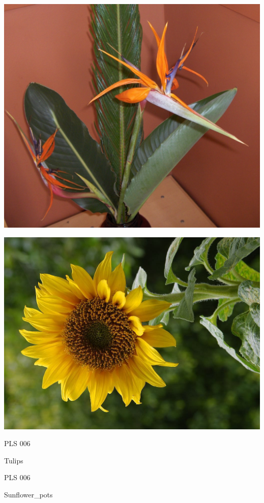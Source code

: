 \documentclass{article}
\begin{document}
\begin{center}
\includegraphics[height=0.925\paperheight]{../Strelezia.jpg}
\end{center}
\newpage

\begin{center}
\includegraphics[height=0.925\paperheight]{../Sunflower.jpg}
\end{center}
\newpage

\noindent  PLS 006
\vfill
\centerline{{\huge Tulips }}
\vfill
\newpage

\noindent  PLS 006
\vfill
\centerline{{\huge Sunflower\_pots }}
\vfill
\newpage
\end{document}
